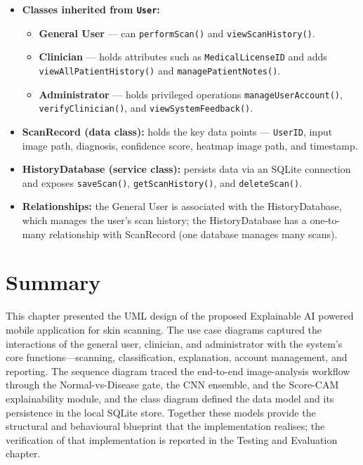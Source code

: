 \begin{itemize}
    \item \textbf{Classes inherited from \texttt{User}:}
    \begin{itemize}
        \item \textbf{General User} — can \texttt{performScan()} and \texttt{viewScanHistory()}.
        \item \textbf{Clinician} — holds attributes such as \texttt{MedicalLicenseID} and adds \texttt{viewAllPatientHistory()} and \texttt{managePatientNotes()}.
        \item \textbf{Administrator} — holds privileged operations \texttt{manageUserAccount()}, \texttt{verifyClinician()}, and \texttt{viewSystemFeedback()}.
    \end{itemize}
    \item \textbf{ScanRecord (data class):} holds the key data points — \texttt{UserID}, input image path, diagnosis, confidence score, heatmap image path, and timestamp.
    \item \textbf{HistoryDatabase (service class):} persists data via an SQLite connection and exposes \texttt{saveScan()}, \texttt{getScanHistory()}, and \texttt{deleteScan()}.
    \item \textbf{Relationships:} the General User is associated with the HistoryDatabase, which manages the user's scan history; the HistoryDatabase has a one-to-many relationship with ScanRecord (one database manages many scans).
\end{itemize}

\section{Summary}

This chapter presented the UML design of the proposed Explainable AI powered
mobile application for skin scanning. The use case diagrams captured the
interactions of the general user, clinician, and administrator with the system's
core functions---scanning, classification, explanation, account management, and
reporting. The sequence diagram traced the end-to-end image-analysis workflow
through the Normal-vs-Disease gate, the CNN ensemble, and the Score-CAM
explainability module, and the class diagram defined the data model and its
persistence in the local SQLite store. Together these models provide the
structural and behavioural blueprint that the implementation realises; the
verification of that implementation is reported in the Testing and Evaluation
chapter.
